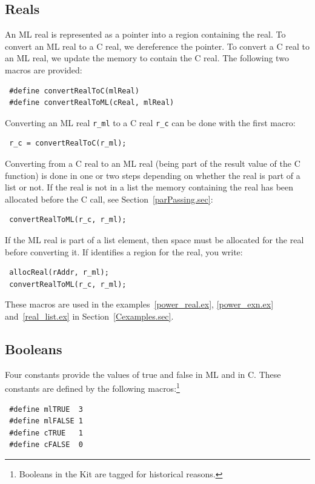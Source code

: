 \documentclass[12pt]{book}
\begin{document}
\subsection{Reals}
An ML real is represented as a pointer into a region containing the
real. To convert an ML real to a C real, we dereference the pointer. To
convert a C real to an ML real, we update the memory to contain the C
real. The following two macros are provided:
%
%
\begin{verbatim}
 #define convertRealToC(mlReal)
 #define convertRealToML(cReal, mlReal)
\end{verbatim}

Converting an ML real \verb|r_ml| to a C real \verb|r_c| can be done with the first macro:
\begin{verbatim}
 r_c = convertRealToC(r_ml);
\end{verbatim}

Converting from a C real to an ML real (being part of the result value of the
C function) is done in one or two steps depending on whether the real is
part of a list or not. If the real is not in a list the memory containing
the real has been allocated before the C call, see Section~\ref{parPassing.sec}:
\begin{verbatim}
 convertRealToML(r_c, r_ml);
\end{verbatim}
If the ML real is part of a list element, then space must be allocated for
the real before converting it. If  identifies a region
for the real, you write:
%
\begin{verbatim}
 allocReal(rAddr, r_ml);
 convertRealToML(r_c, r_ml);
\end{verbatim}

These macros are used in the examples~\ref{power_real.ex},
\ref{power_exn.ex} and~\ref{real_list.ex} in
Section~\ref{Cexamples.sec}.

\subsection{Booleans}
Four constants provide the values of true and false in ML and in
C. These constants are defined by the following macros:\footnote{Booleans in the
Kit are tagged for historical reasons.}
%
%
%
%
\begin{verbatim}
 #define mlTRUE  3
 #define mlFALSE 1
 #define cTRUE   1
 #define cFALSE  0
\end{verbatim}
\end{document}
